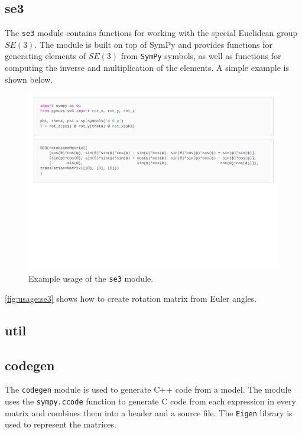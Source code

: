 \subsection{se3}
The \texttt{se3} module contains functions for working with the special Euclidean
group $SE(3)$. The module is built on top of SymPy and provides functions for
generating elements of $SE(3)$ from \texttt{SymPy} symbols, as well as functions
for computing the inverse and multiplication of the elements. A simple example
is shown below.

\begin{figure}[h]
    \centering
    \includegraphics[page=1,width=\linewidth,trim=0 11cm 0 0]{assets/se3.pdf}
    \caption{Example usage of the \texttt{se3} module.}
    \label{fig:usage:se3}
\end{figure}

\autoref{fig:usage:se3} shows how to create rotation matrix from Euler angles.
\subsection{util}

\subsection{codegen}
The \texttt{codegen} module is used to generate C++ code from a model. The module
uses the \texttt{sympy.ccode} function to generate C code from
each expression in every matrix and combines them into a header and a source
file. The \texttt{Eigen} library \cite{eigen3} is used to represent the matrices.

